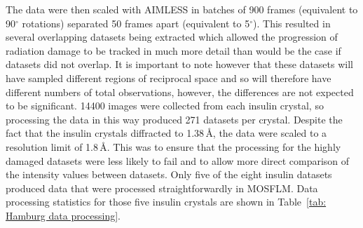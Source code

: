 The data were then scaled with AIMLESS \cite{evans2013} in batches of 900 frames (equivalent to 90$^{\circ}$ rotations) separated 50 frames apart (equivalent to 5$^{\circ}$).
This resulted in several overlapping datasets being extracted which allowed the progression of radiation damage to be tracked in much more detail than would be the case if datasets did not overlap.
It is important to note however that these datasets will have sampled different regions of reciprocal space and so will therefore have different numbers of total observations, however, the differences are not expected to be significant.
14400 images were collected from each insulin crystal, so processing the data in this way produced 271 datasets per crystal.
Despite the fact that the insulin crystals diffracted to 1.38$\,$\AA, the data were scaled to a resolution limit of 1.8$\,$\AA.
This was to ensure that the processing for the highly damaged datasets were less likely to fail and to allow more direct comparison of the intensity values between datasets.
Only five of the eight insulin datasets produced data that were processed straightforwardly in MOSFLM.
Data processing statistics for those five insulin crystals are shown in Table~\ref{tab: Hamburg data processing}.

